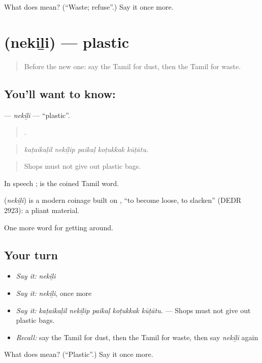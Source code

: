 \begin{tcolorbox}[breakable,colback=teal!4,colframe=teal!35!black,title={Before you move on}]
What does  mean? (\textquotedblleft{}Waste; refuse\textquotedblright{}.) Say it once more.
\end{tcolorbox}
\section[\texorpdfstring{\ta{நெகிழி} (nekiḻi)}{நெகிழி (nekiḻi)}]{ (nekiḻi) — plastic}

\label{lesson:TA-C440-nekili}



\begin{quote}
Before the new one: say the Tamil for dust, then the Tamil for waste.
\end{quote}

\subsection*{You'll want to know: }
\textbf{} — \emph{nekiḻi} — \textquotedblleft{}plastic\textquotedblright{}.

\begin{quote}
    .
\end{quote}

\begin{quote}
\emph{kaṭaikaḷil nekiḻip paikaḷ koṭukkak kūṭātu.}
\end{quote}

\begin{quote}
Shops must not give out plastic bags.
\end{quote}

In speech ;  is the coined Tamil word.

\begin{cousinweb}
\textbf{} (\emph{nekiḻi}) is a modern coinage built on , \textquotedblleft{}to become loose, to slacken\textquotedblright{} (DEDR 2923): a pliant material.
\end{cousinweb}

\begin{grammarlens}[title={What you've built}]
One more word for getting around.
\end{grammarlens}

\subsection*{Your turn}
\begin{itemize}
\raggedright
  \item \emph{Say it:} \emph{nekiḻi}
  \item \emph{Say it:} \emph{nekiḻi}, once more
  \item \emph{Say it:} \emph{kaṭaikaḷil nekiḻip paikaḷ koṭukkak kūṭātu.} — Shops must not give out plastic bags.
  \item \emph{Recall:} say the Tamil for dust, then the Tamil for waste, then say \emph{nekiḻi} again
\end{itemize}

\begin{tcolorbox}[breakable,colback=teal!4,colframe=teal!35!black,title={Before you move on}]
What does  mean? (\textquotedblleft{}Plastic\textquotedblright{}.) Say it once more.
\end{tcolorbox}
